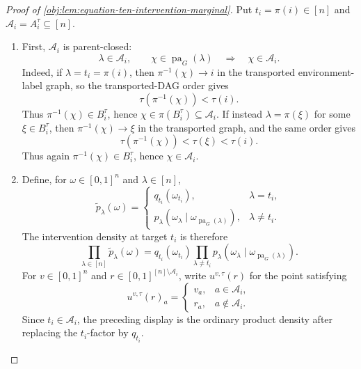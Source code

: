 \begin{proof}[Proof of \cref{obj:lem:equation-ten-intervention-marginal}]
Put \(t_i=\pi(i)\in[n]\) and \(\mathcal A_i=A_i^\tau\subseteq[n]\).

\begin{enumerate}
\item First, \(\mathcal A_i\) is parent-closed:
\[
\lambda\in\mathcal A_i,\qquad \chi\in\operatorname{pa}_G(\lambda)
\quad\Longrightarrow\quad
\chi\in\mathcal A_i .
\]
Indeed, if \(\lambda=t_i=\pi(i)\), then \(\pi^{-1}(\chi)\to i\) in the transported environment-label graph, so the transported-DAG order gives
\[
\tau(\pi^{-1}(\chi))<\tau(i).
\]
Thus \(\pi^{-1}(\chi)\in B_i^\tau\), hence \(\chi\in\pi(B_i^\tau)\subseteq\mathcal A_i\). If instead \(\lambda=\pi(\xi)\) for some \(\xi\in B_i^\tau\), then \(\pi^{-1}(\chi)\to \xi\) in the transported graph, and the same order gives
\[
\tau(\pi^{-1}(\chi))<\tau(\xi)<\tau(i).
\]
Thus again \(\pi^{-1}(\chi)\in B_i^\tau\), hence \(\chi\in\mathcal A_i\). %

\item Define, for \(\omega\in[0,1]^n\) and \(\lambda\in[n]\),
\[
\widetilde p_\lambda(\omega)
=
\begin{cases}
q_{t_i}(\omega_{t_i}), & \lambda=t_i,\\
p_\lambda\!\left(\omega_\lambda\mid
\omega_{\operatorname{pa}_G(\lambda)}\right), & \lambda\ne t_i .
\end{cases}
\]
The intervention density at target \(t_i\) is therefore
\[
\prod_{\lambda\in[n]}\widetilde p_\lambda(\omega)
=
q_{t_i}(\omega_{t_i})
\prod_{\lambda\ne t_i}
p_\lambda\!\left(\omega_\lambda\mid
\omega_{\operatorname{pa}_G(\lambda)}\right).
\]
For \(v\in[0,1]^n\) and \(r\in[0,1]^{[n]\setminus\mathcal A_i}\), write \(u^{v,\tau}(r)\) for the point satisfying
\[
u^{v,\tau}(r)_a=
\begin{cases}
v_a, & a\in\mathcal A_i,\\
r_a, & a\notin\mathcal A_i .
\end{cases}
\]
Since \(t_i\in\mathcal A_i\), the preceding display is the ordinary product density after replacing the \(t_i\)-factor by \(q_{t_i}\).


\end{enumerate}
\end{proof}
